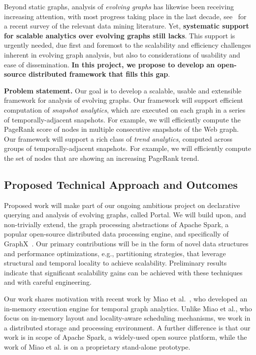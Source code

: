 \documentclass[11pt]{article}
\begin{document}
Beyond static graphs, analysis of {\em evolving graphs} has likewise
been receiving increasing attention, with most progress taking place
in the last decade, see~\cite{DBLP:journals/csur/AggarwalS14} for a
recent survey of the relevant data mining literature.  Yet, {\bf
  systematic support for scalable analytics over evolving graphs still
  lacks}.  This support is urgently needed, due first and foremost to
the scalability and efficiency challenges inherent in evolving graph
analysis, but also to considerations of usability and ease of
dissemination.  {\bf In this project, we propose to develop an
  open-source distributed framework that fills this gap}.  

{\bf Problem statement.} Our goal is to develop a scalable, usable and
extensible framework for analysis of evolving graphs.  Our framework
will support efficient computation of {\em snapshot analytics}, which
are executed on each graph in a series of temporally-adjacent
snapshots.  For example, we will efficiently compute the PageRank
score of nodes in multiple consecutive snapshots of the Web graph.
Our framework will support a rich class of {\em trend analytics},
computed across groups of temporally-adjacent snapshots.  For example,
we will efficiently compute the set of nodes that are showing an
increasing PageRank trend.

\vspace{-0.2cm}
\subsection*{Proposed Technical Approach and Outcomes}
\vspace{-0.2cm}

Proposed work will make part of our ongoing ambitious project on
declarative querying and analysis of evolving graphs, called Portal.
We will build upon, and non-trivially extend, the graph processing
abstractions of Apache Spark, a popular open-source distributed data
processing engine, and specifically of
GraphX~\cite{DBLP:conf/osdi/GonzalezXDCFS14}.  Our primary
contributions will be in the form of novel data structures and
performance optimizations, e.g., partitioning strategies, that
leverage structural and temporal locality to achieve
scalability. Preliminary results indicate that significant scalability
gains can be achieved with these techniques and with careful
engineering.

Our work shares motivation with recent work by Miao et
al.~\cite{DBLP:journals/tos/MiaoHLWYZPCC15}, who developed an
in-memory execution engine for temporal graph analytics.  Unlike Miao
et al., who focus on in-memory layout and locality-aware scheduling
mechanisms, we work in a distributed storage and processing
environment.  A further difference is that our work is in scope of
Apache Spark, a widely-used open source platform, while the work of
Miao et al. is on a proprietary stand-alone prototype.
\end{document}
